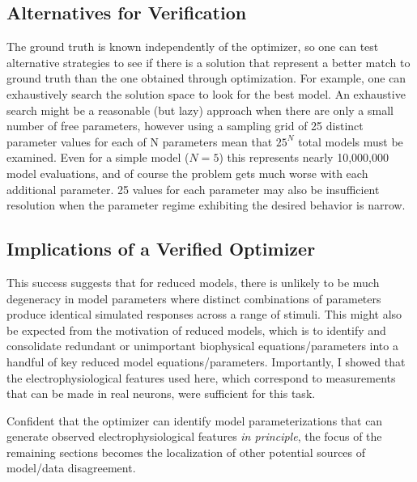 \subsection{Alternatives for Verification}
The ground truth is known independently of the optimizer, so one can test alternative strategies to see if there is a solution that represent a better match to ground truth than the one obtained through optimization.
For example, one can exhaustively search the solution space to look for the best model.
An exhaustive search might be a reasonable (but lazy) approach when there are only a small number of free parameters, however using a sampling grid of 25 distinct parameter values for each of N parameters mean that $25^{N}$ total models must be examined.
Even for a simple model ($N=5$) this represents nearly 10,000,000 model evaluations, and of course the problem gets much worse with each additional parameter.
25 values for each parameter may also be insufficient resolution when the parameter regime exhibiting the desired behavior is narrow.

\subsection{Implications of a Verified Optimizer}
This success suggests that for reduced models, there is unlikely to be much degeneracy in model parameters where distinct combinations of parameters produce identical simulated responses across a range of stimuli. This might also be expected from the motivation of reduced models, which is to identify and consolidate redundant or unimportant biophysical equations/parameters into a handful of key reduced model equations/parameters.
Importantly, I showed that the electrophysiological features used here, which correspond to measurements that can be made in real neurons, were sufficient for this task.

Confident that the optimizer can identify model parameterizations that can generate observed electrophysiological features \emph{in principle}, the focus of the remaining sections becomes the localization of other potential sources of model/data disagreement. 
